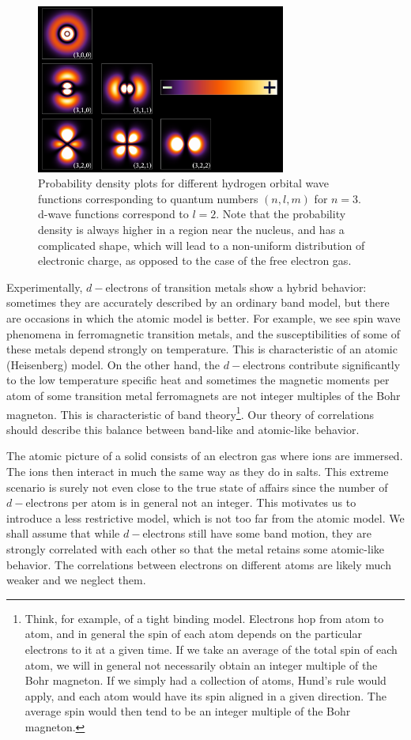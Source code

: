 \begin{figure}[H]\label{fig:hydrogenWF}
\centering
\includegraphics[width = 8.2cm]{Figures/2.HubbardModel/Hydrogen_Density_Plots.png}
\caption{Probability density plots for different hydrogen orbital wave functions corresponding to quantum numbers $(n, l, m)$ for $n = 3$. d-wave functions correspond to $l=2$. Note that the probability density is always higher in a region near the nucleus, and has a complicated shape, which will lead to a non-uniform distribution of electronic charge, as opposed to the case of the free electron gas.}
\end{figure}

Experimentally, $d-$electrons of transition metals show a hybrid behavior: sometimes they are accurately described by an ordinary band model, but there are occasions in which the atomic model is better. For example, we see spin wave phenomena in ferromagnetic transition metals, and the susceptibilities of some of these metals depend strongly on temperature. This is characteristic of an atomic (Heisenberg) model. On the other hand, the $d-$electrons contribute significantly to the low temperature specific heat and sometimes the magnetic moments per atom of some transition metal ferromagnets are not integer multiples of the Bohr magneton. This is characteristic of band theory\footnote{Think, for example, of a tight binding model. Electrons hop from atom to atom, and in general the spin of each atom depends on the particular electrons  to it at a given time. If we take an average of the total spin of each atom, we will in general not necessarily obtain an integer multiple of the Bohr magneton. If we simply had a collection of atoms, Hund's rule would apply, and each atom would have its spin aligned in a given direction. The average spin would then tend to be an integer multiple of the Bohr magneton.}. Our theory of correlations should describe this balance between band-like and atomic-like behavior.

The atomic picture of a solid consists of an electron gas where ions are immersed. The ions then interact in much the same way as they do in salts. This extreme scenario is surely not even close to the true state of affairs since the number of $d-$electrons per atom is in general not an integer. This motivates us to introduce a less restrictive model, which is not too far from the atomic model. We shall assume that while $d-$electrons still have some band motion, they are strongly correlated with each other so that the metal retains some atomic-like behavior. The correlations between electrons on different atoms are likely much weaker and we neglect them.

